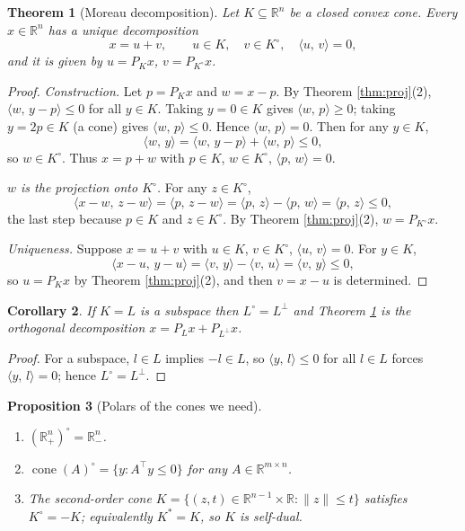 \documentclass[11pt,a4paper]{article}
\theoremstyle{definition}
\theoremstyle{plain}
\newtheorem{theorem}{Theorem}
\newtheorem{proposition}[theorem]{Proposition}
\newtheorem{corollary}[theorem]{Corollary}
\theoremstyle{remark}
\newcommand{\R}{\mathbb{R}}
\newcommand{\ip}[2]{\langle #1,\, #2\rangle}
\newcommand{\norm}[1]{\lVert #1\rVert}
\newcommand{\proj}{P}
\DeclareMathOperator{\cone}{cone}
\begin{document}
\begin{theorem}[Moreau decomposition]
\label{thm:moreau}
Let $K\subseteq\R^n$ be a closed convex cone. Every $x\in\R^n$ has a unique decomposition
\[
x=u+v,\qquad u\in K,\quad v\in K^\circ,\quad \ip{u}{v}=0 ,
\]
and it is given by $u=\proj_Kx$, $v=\proj_{K^\circ}x$.
\end{theorem}

\begin{proof}
\emph{Construction.} Let $p=\proj_Kx$ and $w=x-p$. By Theorem \ref{thm:proj}(2),
$\ip{w}{y-p}\le0$ for all $y\in K$. Taking $y=0\in K$ gives $\ip{w}{p}\ge0$; taking
$y=2p\in K$ (a cone) gives $\ip{w}{p}\le0$. Hence $\ip{w}{p}=0$. Then for any $y\in K$,
\[
\ip{w}{y}=\ip{w}{y-p}+\ip{w}{p}\le0 ,
\]
so $w\in K^\circ$. Thus $x=p+w$ with $p\in K$, $w\in K^\circ$, $\ip{p}{w}=0$.

\emph{$w$ is the projection onto $K^\circ$.} For any $z\in K^\circ$,
\[
\ip{x-w}{z-w}=\ip{p}{z-w}=\ip{p}{z}-\ip{p}{w}=\ip{p}{z}\le0 ,
\]
the last step because $p\in K$ and $z\in K^\circ$. By Theorem \ref{thm:proj}(2),
$w=\proj_{K^\circ}x$.

\emph{Uniqueness.} Suppose $x=u+v$ with $u\in K$, $v\in K^\circ$, $\ip{u}{v}=0$. For $y\in K$,
\[
\ip{x-u}{y-u}=\ip{v}{y}-\ip{v}{u}=\ip{v}{y}\le0 ,
\]
so $u=\proj_Kx$ by Theorem \ref{thm:proj}(2), and then $v=x-u$ is determined.
\end{proof}

\begin{corollary}
\label{cor:subspace}
If $K=L$ is a subspace then $L^\circ=L^\perp$ and Theorem \ref{thm:moreau} is the orthogonal
decomposition $x=\proj_Lx+\proj_{L^\perp}x$.
\end{corollary}

\begin{proof}
For a subspace, $l\in L$ implies $-l\in L$, so $\ip{y}{l}\le0$ for all $l\in L$ forces
$\ip{y}{l}=0$; hence $L^\circ=L^\perp$.
\end{proof}

\begin{proposition}[Polars of the cones we need]
\label{prop:polarex}
\begin{enumerate}
\item $(\R^n_+)^\circ=\R^n_-$.
\item $\cone(A)^\circ=\{y:A^\top y\le0\}$ for any $A\in\R^{m\times n}$.
\item The second-order cone $K=\{(z,t)\in\R^{n-1}\times\R:\norm z\le t\}$ satisfies
$K^\circ=-K$; equivalently $K^*=K$, so $K$ is self-dual.
\end{enumerate}
\end{proposition}
\end{document}
